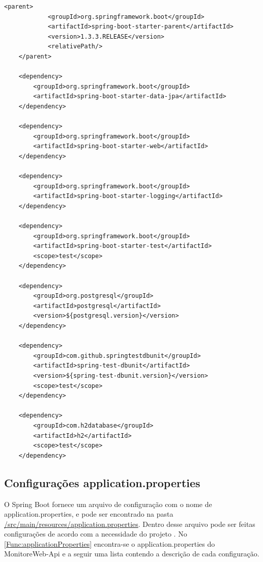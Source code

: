 \begin{lstlisting}[style=XML,label=Func:POMMonitorWebApi,caption={[Arquivo POM com as principais dependências do projeto.]Arquivo POM com as principais dependências do projeto.}]
	<parent>
			<groupId>org.springframework.boot</groupId>
			<artifactId>spring-boot-starter-parent</artifactId>
			<version>1.3.3.RELEASE</version>
			<relativePath/>
	</parent>
	
	<dependency>
		<groupId>org.springframework.boot</groupId>
		<artifactId>spring-boot-starter-data-jpa</artifactId>
	</dependency>
	
	<dependency>
		<groupId>org.springframework.boot</groupId>
		<artifactId>spring-boot-starter-web</artifactId>
	</dependency>

	<dependency>
		<groupId>org.springframework.boot</groupId>
		<artifactId>spring-boot-starter-logging</artifactId>
	</dependency>

	<dependency>
		<groupId>org.springframework.boot</groupId>
		<artifactId>spring-boot-starter-test</artifactId>
		<scope>test</scope>
	</dependency>
				
	<dependency>
		<groupId>org.postgresql</groupId>
		<artifactId>postgresql</artifactId>
		<version>${postgresql.version}</version>
	</dependency>

	<dependency>
		<groupId>com.github.springtestdbunit</groupId>
		<artifactId>spring-test-dbunit</artifactId>
		<version>${spring-test-dbunit.version}</version>
		<scope>test</scope>
	</dependency>

	<dependency>
		<groupId>com.h2database</groupId>
		<artifactId>h2</artifactId>
		<scope>test</scope>
	</dependency>
\end{lstlisting}



\subsection{Configurações application.properties}\label{subsec:ConfiguraçõesApplicationProperties}

O Spring Boot fornece um arquivo de configuração com o nome de application.properties, e pode ser encontrado na pasta \url{/src/main/resources/application.properties}. Dentro desse arquivo pode ser feitas configurações de acordo com a necessidade do projeto \cite{springBoot:2017}. No \autoref{Func:applicationProperties} encontra-se o application.properties do MonitoreWeb-Api e a seguir uma lista contendo a descrição de cada configuração.

